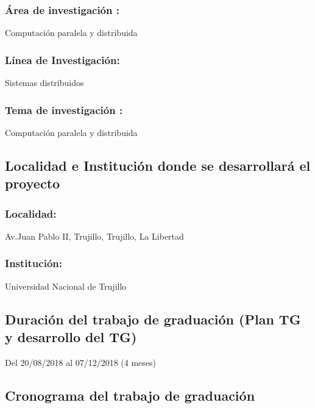     \subsubsection{Área de investigación :} 
    Computación paralela y distribuida
    
    \subsubsection{Línea de Investigación:} 
    Sistemas distribuidos
                
    \subsubsection{Tema de investigación :}
    Computación paralela y distribuida


\subsection{Localidad e Institución donde se desarrollará el proyecto }
  
    \subsubsection{Localidad:} 
    Av.Juan Pablo II, Trujillo, Trujillo, La Libertad

    \subsubsection{Institución:}
    Universidad Nacional de Trujillo

\subsection{Duración del trabajo de graduación (Plan TG y desarrollo del TG)}
Del 20/08/2018 al 07/12/2018 (4 meses)

\subsection{Cronograma del trabajo de graduación}

